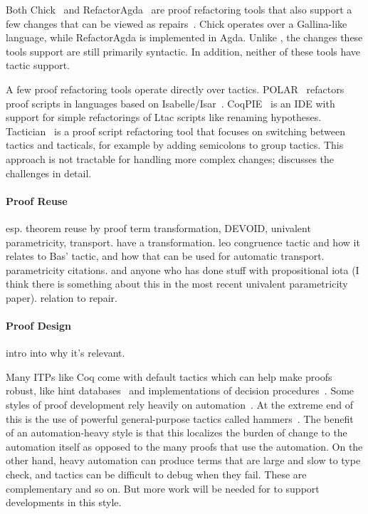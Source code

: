 Both Chick~\cite{robert2018} and RefactorAgda~\cite{wibergh2019} are proof refactoring tools that
also support a few changes that can be viewed as repairs~\cite{PGL-045}.
Chick operates over a Gallina-like language, while RefactorAgda is implemented in Agda.
Unlike \toolname, the changes these tools support are still primarily syntactic.
In addition, neither of these tools have tactic support.

A few proof refactoring tools operate directly over tactics.
POLAR~\cite{Dietrich2013} refactors proof scripts in languages based on Isabelle/Isar~\cite{Wenzel2007isar}.
CoqPIE~\cite{Roe2016} is an IDE with support for simple refactorings of Ltac scripts like renaming hypotheses.
Tactician~\cite{adams2015} is a proof script refactoring tool that focuses on switching between tactics and tacticals,
for example by adding semicolons to group tactics.
This approach is not tractable for handling more complex changes;
\citet{robert2018} discusses the challenges in detail.

\paragraph{Proof Reuse}

esp. theorem reuse by proof term transformation, DEVOID, univalent parametricity, transport. \cite{magaud2000changing} have a transformation.
leo congruence tactic and how it relates to Bas' tactic, and how that can be used for automatic transport.
parametricity citations. and anyone who has done stuff with propositional iota (I think there is something about this in
the most recent univalent parametricity paper).
relation to repair.

\paragraph{Proof Design}

intro into why it's relevant.

Many ITPs like Coq come with default tactics which can
help make proofs robust, like hint databases~\cite{coq-intro} and implementations of decision procedures~\cite{Pugh1991}. 
Some styles of proof development rely heavily on automation~\cite{Chlipala:2013:CPD:2584504}.
At the extreme end of this is the use of powerful general-purpose tactics 
called hammers~\cite{Blanchette2016b, Blanchette2013, Kaliszyk2014, Czajka2018}.
The benefit of an automation-heavy style is that this localizes the burden of change to the automation itself as opposed 
to the many proofs that use the automation.
On the other hand, heavy automation can produce terms that are large and slow to type check,
and tactics can be difficult to debug when they fail.
These are complementary and so on.
But more work will be needed for \toolname to support developments in this style.

